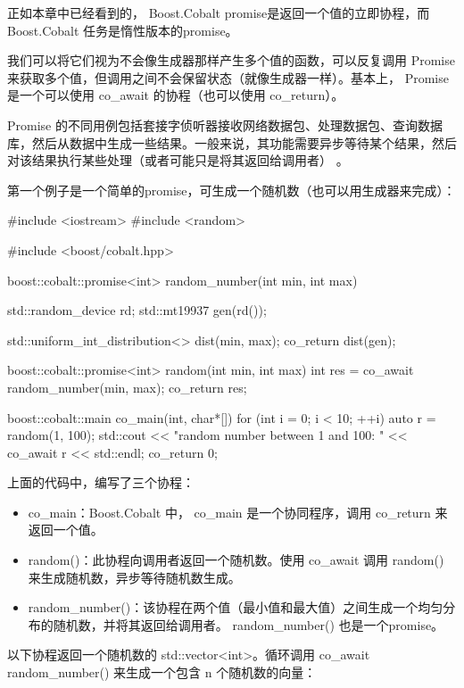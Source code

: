 正如本章中已经看到的， Boost.Cobalt promise是返回一个值的立即协程，而 Boost.Cobalt 任务是惰性版本的promise。

我们可以将它们视为不会像生成器那样产生多个值的函数，可以反复调用 Promise 来获取多个值，但调用之间不会保留状态（就像生成器一样）。基本上， Promise 是一个可以使用 co\_await 的协程（也可以使用 co\_return）。

Promise 的不同用例包括套接字侦听器接收网络数据包、处理数据包、查询数据库，然后从数据中生成一些结果。一般来说，其功能需要异步等待某个结果，然后对该结果执行某些处理（或者可能只是将其返回给调用者） 。

第一个例子是一个简单的promise，可生成一个随机数（也可以用生成器来完成）：

\begin{cpp}
#include <iostream>
#include <random>

#include <boost/cobalt.hpp>

boost::cobalt::promise<int> random_number(int min, int max) {
    std::random_device rd;
    std::mt19937 gen(rd());

    std::uniform_int_distribution<> dist(min, max);
    co_return dist(gen);
}

boost::cobalt::promise<int> random(int min, int max) {
    int res = co_await random_number(min, max);
    co_return res;
}

boost::cobalt::main co_main(int, char*[]) {
    for (int i = 0; i < 10; ++i) {
        auto r = random(1, 100);
        std::cout << "random number between 1 and 100: "
                  << co_await r << std::endl;
    }
    co_return 0;
}
\end{cpp}

上面的代码中，编写了三个协程：

\begin{itemize}
\item
co\_main：Boost.Cobalt 中， co\_main 是一个协同程序，调用 co\_return 来返回一个值。

\item
random()：此协程向调用者返回一个随机数。使用 co\_await 调用 random() 来生成随机数，异步等待随机数生成。

\item
random\_number()：该协程在两个值（最小值和最大值）之间生成一个均匀分布的随机数，并将其返回给调用者。 random\_number() 也是一个promise。
\end{itemize}

以下协程返回一个随机数的 std::vector<int>。循环调用 co\_await random\_number() 来生成一个包含 n 个随机数的向量：

